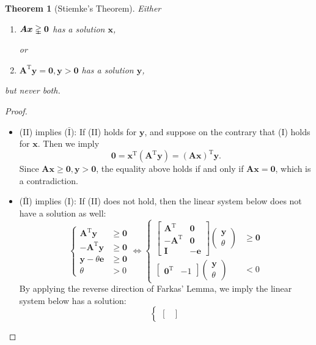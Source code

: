 \documentclass[12pt]{article}
\newcommand{\trans}{^{\mathrm T}}
\newtheorem{theorem}{Theorem}[section]
\begin{document}
\begin{theorem}[Stiemke's Theorem]
Either
\begin{enumerate}
\item[(I)]
$\bm A\bm x\gvertneqq\bm0$ has a solution $\bm x$,

or
\item[(II)]
$\bm A\trans\bm y=\bm0,\bm y>\bm0$ has a solution $\bm y$,
\end{enumerate}
but never both.
\end{theorem}
\begin{proof}
\begin{itemize}
\item
(II) implies ($\bar{\text{I}}$):
If (II) holds for $\bm y$, and suppose on the contrary that (I) holds for $\bm x$. Then we imply
\[
\bm0=\bm x\trans(\bm A\trans\bm y)=(\bm A\bm x)\trans\bm y.
\]
Since $\bm{Ax}\ge\bm0,\bm y>\bm0$, the equality above holds if and only if $\bm{Ax}=\bm0$, which is a contradiction.
\item
($\bar{\text{II}}$) implies (I):
If (II) does not hold, then the linear system below does not have a solution as well:
\[
\left\{
\begin{aligned}
\bm A\trans\bm y&\ge\bm0\\
-\bm A\trans\bm y&\ge\bm0\\
\bm y-\theta\bm e&\ge\bm0\\
\theta&>0
\end{aligned}
\right.
\Longleftrightarrow
\left\{
\begin{aligned}
\begin{bmatrix}
\bm A\trans&\bm0\\-\bm A\trans&\bm0\\\bm I&-\bm e
\end{bmatrix}\begin{pmatrix}
\bm y\\\theta
\end{pmatrix}&\ge\bm0\\
\begin{bmatrix}
\bm 0\trans&-1
\end{bmatrix}\begin{pmatrix}
\bm y\\\theta
\end{pmatrix}&<0
\end{aligned}
\right.
\]
By applying the reverse direction of Farkas' Lemma, we imply the linear system below has a solution:
\[
\left\{
\begin{aligned}
\begin{bmatrix}

\end{bmatrix}
\end{aligned}\]
\end{itemize}
\end{proof}
\end{document}
